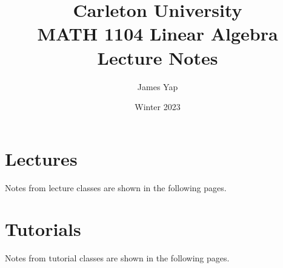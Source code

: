 \documentclass[12pt, letterpaper]{article}
\title{Carleton University \\ MATH 1104 Linear Algebra \\ Lecture Notes}
\author{James Yap}
\date{Winter 2023}
\begin{document}
\maketitle
\pagebreak
\tableofcontents
\pagebreak

\section{Lectures}
Notes from lecture classes are shown in the following pages.


\section{Tutorials}
Notes from tutorial classes are shown in the following pages.

\end{document}
